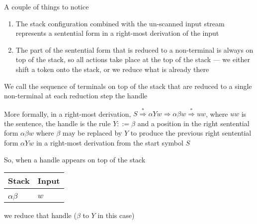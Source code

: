 \documentclass[8pt,a4paper,compress,handout]{beamer}
\newcommand{\derives}{\stackrel{*}{\Rightarrow}}
\begin{document}
\begin{frame}[fragile]
\pause

A couple of things to notice
\begin{enumerate}
\item The stack configuration combined with the un-scanned input stream represents a sentential form in a right-most derivation of the input

\item The part of the sentential form that is reduced to a non-terminal is always on top of the stack, so all actions take place at the top of the stack --- we either shift a token onto the stack, or we reduce what is already there
\end{enumerate}

\pause
\bigskip

We call the sequence of terminals on top of the stack that are reduced to a single non-terminal at each reduction step the handle

\pause
\bigskip

More formally, in a right-most derivation, $S \derives\alpha Yw \Rightarrow \alpha \beta w \derives uw$, where $uw$ is the sentence, the handle is the rule $Y ::= \beta$ and a position in the right sentential form $\alpha \beta w$ where $\beta$ may be replaced by $Y$ to produce the previous right sentential form $\alpha Yw$ in a right-most derivation from the start symbol $S$

\pause
\bigskip

So, when a handle appears on top of the stack

\begin{table}[H]
\begin{tabular}{ll}
Stack & Input \\ \hline \\
$\alpha \beta$ & $w$
\end{tabular}
\end{table}
\noindent we reduce that handle ($\beta$ to $Y$ in this case)
\end{frame}
\end{document}
